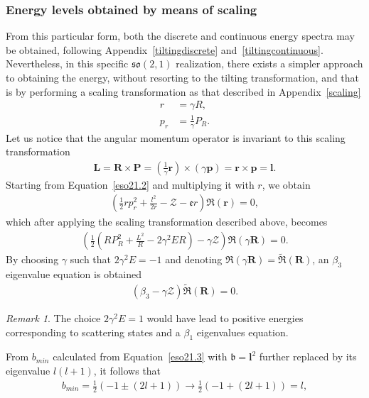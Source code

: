 \documentclass[12pt,a4paper]{report}
\theoremstyle{definition}
\theoremstyle{remark}
\newtheorem*{remark}{Remark}
\theoremstyle{remark}
\begin{document}
\subsubsection{Energy levels obtained by means of scaling}
From this particular form, both the discrete and continuous energy spectra may be obtained, following Appendix~\ref{tiltingdiscrete} and~\ref{tiltingcontinuous}. Nevertheless, in this specific $\mathfrak{so}(2,1)$ realization, there exists a simpler approach to obtaining the energy, without resorting to the tilting transformation, and that is by performing a scaling transformation as that described in Appendix~\ref{scaling}
\begin{align*}
r&=\gamma R,\\
p_r&=\frac{1}{\gamma}P_R.
\end{align*}
Let us notice that the angular momentum operator is invariant to this scaling transformation
\begin{align*}
\textbf{L}=\textbf{R}\times\textbf{P}=\left(\frac{1}{\gamma}\textbf{r}\right)\times(\gamma\textbf{p})=\textbf{r}\times\textbf{p}=\textbf{l}.
\end{align*}
Starting from Equation~\ref{eso21.2} and multiplying it with $r$, we obtain
\begin{align*}
\left(\frac{1}{2}rp_r^2+\frac{l^2}{2r}-\mathcal{Z}-\mathfrak{e}r\right)\mathfrak{R}(\textbf{r})=0,
\end{align*}
which after applying the scaling transformation described above, becomes
\begin{align*}
\left(\frac{1}{2}\left(RP_R^2+\frac{L^2}{R}-2\gamma^2ER\right)-\gamma\mathcal{Z}\right)\mathfrak{R}(\gamma\textbf{R})=0.
\end{align*}
By choosing $\gamma$ such that $2\gamma^2E=-1$ and denoting $\mathfrak{R}(\gamma\textbf{R})=\widetilde{\mathfrak{R}}(\textbf{R})$, an $\beta_3$ eigenvalue equation is obtained
\begin{align*}
(\beta_3-\gamma\mathcal{Z})\widetilde{\mathfrak{R}}(\textbf{R})=0.
\end{align*}
\begin{remark} The choice $2\gamma^2E=1$ would have lead to positive energies corresponding to scattering states and a $\beta_1$ eigenvalues equation.
\end{remark}
From $b_{min}$ calculated from Equation~\ref{eso21.3} with $\mathfrak{b}=\textbf{l}^2$ further replaced by its eigenvalue $l(l+1)$, it follows that
\begin{align*}
b_{min}=\frac{1}{2}(-1\pm(2l+1))\rightarrow \frac{1}{2}(-1+(2l+1))=l,
\end{align*}
\end{document}

